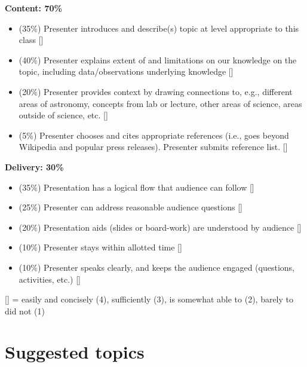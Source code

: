 \documentclass[11pt]{article}
\begin{document}
\noindent
\textbf{Content: 70\%}
\begin{itemize}
\item (35\%) Presenter introduces and describe(s) topic at level appropriate to this class [\underline{\hspace{5mm}}]
\item (40\%) Presenter explains extent of and limitations on our knowledge on the topic, including data/observations underlying knowledge [\underline{\hspace{5mm}}]
\item (20\%) Presenter provides context by drawing connections to, e.g., different areas of astronomy, concepts from lab or
lecture, other areas of science, areas outside of science, etc. [\underline{\hspace{5mm}}]
\item (5\%) Presenter chooses and cites appropriate references (i.e., goes beyond Wikipedia and popular press releases).  Presenter submits reference list. [\underline{\hspace{5mm}}]
\end{itemize} 

\noindent
\textbf{Delivery: 30\%}
\begin{itemize}
\item (35\%) Presentation has a logical flow that audience can follow [\underline{\hspace{5mm}}]
\item (25\%) Presenter can address reasonable audience questions [\underline{\hspace{5mm}}]
\item (20\%) Presentation aids (slides or board-work) are understood by audience [\underline{\hspace{5mm}}]
\item (10\%) Presenter stays within allotted time [\underline{\hspace{5mm}}]
\item (10\%) Presenter speaks clearly, and keeps the audience engaged (questions, activities, etc.) [\underline{\hspace{5mm}}]
\end{itemize}
{\small [\underline{\hspace{5mm}}] = easily and concisely (4), sufficiently (3),
is somewhat able to (2), barely to did not (1)
}
\pagebreak
\section{Suggested topics}
\end{document}
